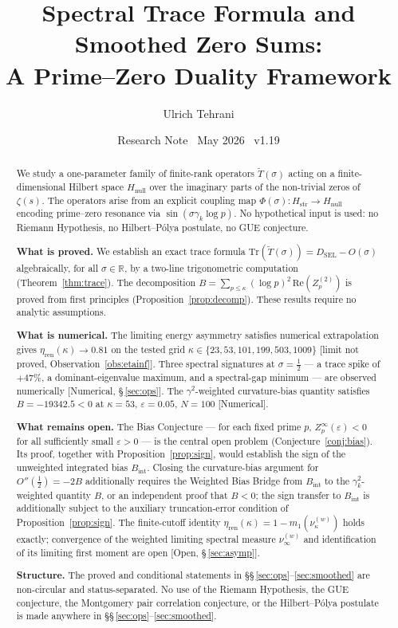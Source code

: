 \documentclass[11pt]{article}
\title{\vspace{-1.5em}\bfseries Spectral Trace Formula and Smoothed Zero Sums:\\[0.4em]
\large A Prime--Zero Duality Framework}
\author{Ulrich Tehrani}
\date{Research Note \textperiodcentered\ May 2026
      \textperiodcentered\ v1.19}
\newcommand{\Hstr}{H_{\mathrm{str}}}
\newcommand{\Hnull}{H_{\mathrm{null}}}
\newcommand{\etaren}{\eta_{\mathrm{ren}}}
\newcommand{\Tt}{\widetilde{T}}
\newcommand{\DSEL}{D_{\mathrm{SEL}}}
\begin{document}
\maketitle

\begin{abstract}
We study a one-parameter family of finite-rank operators $\Tt(\sigma)$
acting on a finite-dimensional Hilbert space $\Hnull$ over the imaginary
parts of the non-trivial zeros of $\zeta(s)$.
The operators arise from an explicit coupling map
$\Phi(\sigma)\colon\Hstr\to\Hnull$
encoding prime--zero resonance via
$\sin(\sigma\gamma_k\log p)$.
No hypothetical input is used: no Riemann Hypothesis,
no Hilbert--P\'olya postulate, no GUE conjecture.

\textbf{What is proved.}
We establish an exact trace formula
$\mathrm{Tr}(\Tt(\sigma)) = \DSEL - O(\sigma)$
algebraically, for all $\sigma\in\mathbb{R}$, by a two-line
trigonometric computation (Theorem~\ref{thm:trace}).
The decomposition $B = \sum_{p\leq\kappa}(\log p)^2\,\mathrm{Re}(Z_p^{(2)})$
is proved from first principles (Proposition~\ref{prop:decomp}).
These results require no analytic assumptions.

\textbf{What is numerical.}
The limiting energy asymmetry satisfies
numerical extrapolation gives $\etaren(\kappa)\to 0.81$
on the tested grid $\kappa\in\{23,53,101,199,503,1009\}$
[limit not proved, Observation~\ref{obs:etainf}].
Three spectral signatures at $\sigma=\tfrac{1}{2}$ --- a trace spike
of $+47\%$, a dominant-eigenvalue maximum, and a spectral-gap minimum
--- are observed numerically [Numerical, \S\,\ref{sec:ops}].
The $\gamma^2$-weighted curvature-bias quantity satisfies $B = -19342.5 < 0$
at $\kappa=53$, $\varepsilon=0.05$, $N=100$ [Numerical].

\textbf{What remains open.}
The Bias Conjecture --- for each fixed prime $p$,
$Z_p^\infty(\varepsilon)<0$ for all
sufficiently small $\varepsilon>0$ --- is the
central open problem (Conjecture~\ref{conj:bias}).
Its proof, together with Proposition~\ref{prop:sign},
would establish the sign of the unweighted integrated bias
$B_{\mathrm{int}}$.
Closing the curvature-bias argument for $O''(\tfrac{1}{2})=-2B$
additionally requires the Weighted Bias Bridge from $B_{\mathrm{int}}$
to the $\gamma_k^2$-weighted quantity $B$,
or an independent proof that $B<0$; the sign transfer to
$B_{\mathrm{int}}$ is additionally subject to the auxiliary
truncation-error condition of Proposition~\ref{prop:sign}.
The finite-cutoff identity $\etaren(\kappa)=1-m_1(\nu_\kappa^{(w)})$
holds exactly; convergence of the weighted limiting spectral measure
$\nu_\infty^{(w)}$ and identification of its limiting first moment are open
[Open, \S\,\ref{sec:asymp}].

\textbf{Structure.}
The proved and conditional statements in
\S\S\,\ref{sec:ops}--\ref{sec:smoothed}
are non-circular and status-separated.
No use of the Riemann Hypothesis, the GUE conjecture,
the Montgomery pair correlation conjecture, or the Hilbert--P\'olya
postulate is made anywhere in \S\S\,\ref{sec:ops}--\ref{sec:smoothed}.
\end{abstract}
\end{document}
